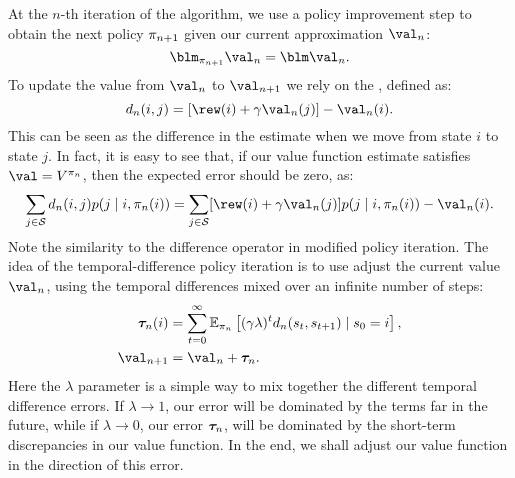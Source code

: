At the $n$-th iteration of the algorithm, we use a policy improvement step to obtain the next policy $\pi_{n+1}$ given our current approximation $\val_n$:
\begin{equation}
  \blm_{\pol_{n+1}} \val_n = \blm \val_n.
\end{equation}
To update the value from $\val_n$ to $\val_{n+1}$ we rely on the , defined as:
\begin{equation}
  d_n(i,j) = [\rew(i) + \disc \val_n(j)] - \val_n(i).
\end{equation}
This can be seen as the difference in the estimate
when we move from state $i$ to state $j$. In fact, it is easy to see that, if our value function estimate satisfies $\val = V^{\pol_n}$, then the expected error should be zero, as:
\[
\sum_{j \in \CS} d_n(i,j) p(j \mid i, \pol_n (i)) = 
\sum_{j \in \CS} [\rew(i) + \disc \val_n(j)] p(j \mid i, \pol_n(i))
-\val_{n}(i).
\]
Note the similarity to the difference operator in modified policy iteration.  The idea of the temporal-difference policy iteration is to use adjust the current value $\val_n$, using the temporal differences mixed over an infinite number of steps:
\begin{align}
  \vectorsym{\tau}_n(i) &= \sum_{t=0}^\infty \E_{\pol_n} \left[(\disc \lambda)^t d_n(s_t,s_{t+1}) \mid s_0 = i\right],\\
  \val_{n+1} &= \val_n + \vectorsym{\tau}_n.
\end{align}
Here the $\lambda$ parameter is a simple way to mix together the different temporal difference errors. If $\lambda \to 1$, our error will be dominated by the terms far in the future, while if $\lambda \to 0$, our error $\vectorsym{\tau}_n$, will be dominated by the short-term discrepancies in our value function. In the end, we shall adjust our value function in the direction of this error.

